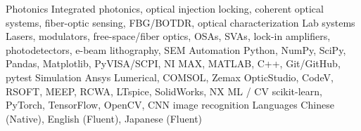 
\begin{cvskills}
  \cvskill
    {Photonics}
    {Integrated photonics, optical injection locking, coherent optical systems, fiber-optic sensing, FBG/BOTDR, optical characterization}
  \cvskill
    {Lab systems}
    {Lasers, modulators, free-space/fiber optics, OSAs, SVAs, lock-in amplifiers, photodetectors, e-beam lithography, SEM}
  \cvskill
    {Automation}
    {Python, NumPy, SciPy, Pandas, Matplotlib, PyVISA/SCPI, NI MAX, MATLAB, C++, Git/GitHub, pytest}
  \cvskill
    {Simulation}
    {Ansys Lumerical, COMSOL, Zemax OpticStudio, CodeV, RSOFT, MEEP, RCWA, LTspice, SolidWorks, NX}
  \cvskill
    {ML / CV}
    {scikit-learn, PyTorch, TensorFlow, OpenCV, CNN image recognition}
  \cvskill
    {Languages}
    {Chinese (Native), English (Fluent), Japanese (Fluent)}
\end{cvskills}
